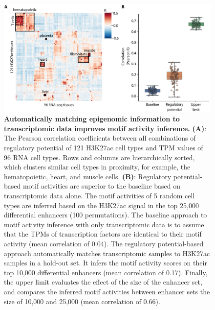 \begin{figure}
    \centering
    \includegraphics[width=1\linewidth]{ch.scepia/imgs/CellTypes_MvS_Myriad_thicks_Figure1.png}
    \caption{\textbf{Automatically matching epigenomic information to transcriptomic data improves motif activity inference.} \textbf{(A)}: The Pearson correlation coefficients between all combinations of regulatory potential of 121 H3K27ac cell types and TPM values of 96 RNA cell types. Rows and columns are hierarchically sorted, which clusters similar cell types in proximity, for example, the hematopoietic, heart, and muscle cells. \textbf{(B)}: Regulatory potential-based motif activities are superior to the baseline based on transcriptomic data alone. The motif activities of 5 random cell types are inferred based on the H3K27ac signal in the top 25,000 differential enhancers (100 permutations). The baseline approach to motif activity inference with only transcriptomic data is to assume that the TPMs of transcription factors are identical to their motif activity (mean correlation of 0.04). The regulatory potential-based approach automatically matches transcriptomic samples to H3K27ac samples in a hold-out set. It infers the motif activity scores on their top 10,000 differential enhancers (mean correlation of 0.17). Finally,  the upper limit evaluates the effect of the size of the enhancer set, and compares the inferred motif activities between enhancer sets the size of 10,000 and 25,000 (mean correlation of 0.66).}
    \label{fig:bulk_comparison}
\end{figure}

